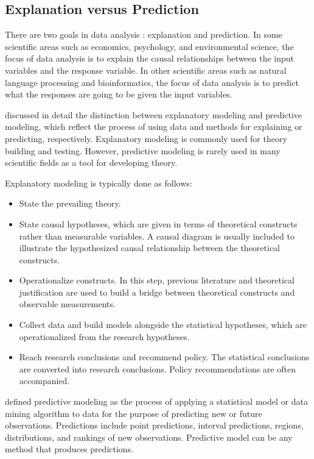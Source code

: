 \documentclass[]{book}
\theoremstyle{definition}
\theoremstyle{definition}
\theoremstyle{definition}
\theoremstyle{remark}
\begin{document}
\subsection{Explanation versus Prediction}\label{S:expred}

There are two goals in data analysis
\citep{breiman2001modeling, shmueli2010model}: explanation and
prediction. In some scientific areas such as economics, psychology, and
environmental science, the focus of data analysis is to explain the
causal relationships between the input variables and the response
variable. In other scientific areas such as natural language processing
and bioinformatics, the focus of data analysis is to predict what the
responses are going to be given the input variables.

\citet{shmueli2010model} discussed in detail the distinction between
explanatory modeling and predictive modeling, which reflect the process
of using data and methods for explaining or predicting, respectively.
Explanatory modeling is commonly used for theory building and testing.
However, predictive modeling is rarely used in many scientific fields as
a tool for developing theory.

Explanatory modeling is typically done as follows:

\begin{itemize}
\item
  State the prevailing theory.
\item
  State causal hypotheses, which are given in terms of theoretical
  constructs rather than measurable variables. A causal diagram is
  usually included to illustrate the hypothesized causal relationship
  between the theoretical constructs.
\item
  Operationalize constructs. In this step, previous literature and
  theoretical justification are used to build a bridge between
  theoretical constructs and observable measurements.
\item
  Collect data and build models alongside the statistical hypotheses,
  which are operationalized from the research hypotheses.
\item
  Reach research conclusions and recommend policy. The statistical
  conclusions are converted into research conclusions. Policy
  recommendations are often accompanied.
\end{itemize}

\citet{shmueli2010model} defined predictive modeling as the process of
applying a statistical model or data mining algorithm to data for the
purpose of predicting new or future observations. Predictions include
point predictions, interval predictions, regions, distributions, and
rankings of new observations. Predictive model can be any method that
produces predictions.
\end{document}
